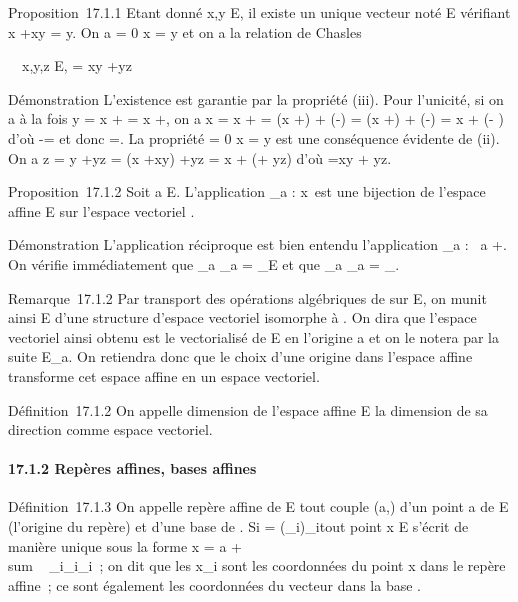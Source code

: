 \documentclass[]{article}
\begin{document}
Proposition~17.1.1 Etant donné x,y \in E, il existe un unique vecteur noté
\overrightarrowxy \in\overrightarrow
E vérifiant x +\overrightarrow xy = y. On a
\overrightarrowxy = 0 \Leftrightarrow x
= y et on a la relation de Chasles

\forall~~x,y,z \in E,
\overrightarrowxz =\overrightarrow
xy +\overrightarrow yz

Démonstration L'existence est garantie par la propriété (iii). Pour
l'unicité, si on a à la fois y = x +\overrightarrow \xi
= x +\overrightarrow \eta, on a x = x
+ = (x
+\overrightarrow \xi) +
(-\overrightarrow\xi) = (x
+\overrightarrow \eta) +
(-\overrightarrow\xi) = x +
(\overrightarrow\eta -\overrightarrow
\xi) d'où \overrightarrow\xi
-\overrightarrow \eta = et donc \overrightarrow\xi
=\overrightarrow \eta. La propriété
\overrightarrowxy = 0 \Leftrightarrow x
= y est une conséquence évidente de (ii). On a z = y
+\overrightarrow yz = (x
+\overrightarrow xy)
+\overrightarrow yz = x +
(\overrightarrowxy +\overrightarrow
yz) d'où \overrightarrowxz
=\overrightarrow xy +\overrightarrow
yz.

Proposition~17.1.2 Soit a \in E. L'application \phi_a :
x\mapsto~\overrightarrowax est
une bijection de l'espace affine E sur l'espace vectoriel
\overrightarrowE.

Démonstration L'application réciproque est bien entendu l'application
\psi_a :\overrightarrow
\xi\mapsto~a +\overrightarrow \xi.
On vérifie immédiatement que \psi_a \cdot \phi_a =
\mathrmId_E et que \phi_a \cdot \psi_a
=
\mathrmId_\overrightarrowE.

Remarque~17.1.2 Par transport des opérations algébriques de
\overrightarrowE sur E, on munit ainsi E d'une
structure d'espace vectoriel isomorphe à
\overrightarrowE. On dira que l'espace vectoriel
ainsi obtenu est le vectorialisé de E en l'origine a et on le notera par
la suite E_a. On retiendra donc que le choix d'une origine dans
l'espace affine transforme cet espace affine en un espace vectoriel.

Définition~17.1.2 On appelle dimension de l'espace affine E la dimension
de sa direction \overrightarrowE comme espace
vectoriel.

\paragraph{17.1.2 Repères affines, bases affines}

Définition~17.1.3 On appelle repère affine de E tout couple (a,) d'un
point a de E (l'origine du repère) et d'une base  de
\overrightarrowE. Si  =
(\vece_i)_i\inI tout point x \in E
s'écrit de manière unique sous la forme x = a
+ \\sum ~
_i\inIx_i\vece_i~; on dit que
les x_i sont les coordonnées du point x dans le repère affine~;
ce sont également les coordonnées du vecteur
\overrightarrowax dans la base .
\end{document}
